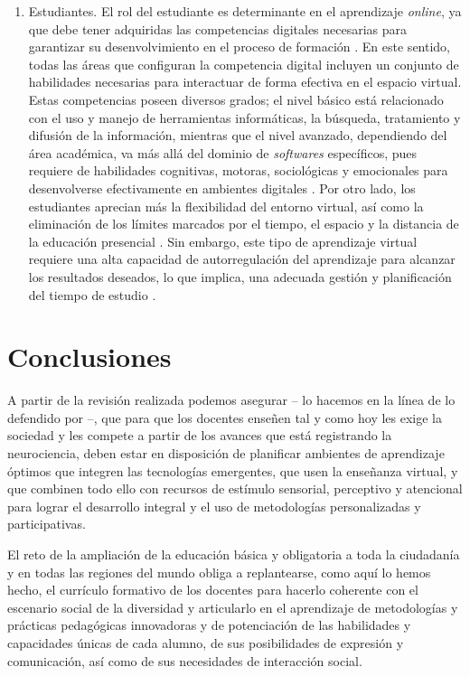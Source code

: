 \documentclass[spanish]{textolivre}
\begin{document}
\begin{enumerate}[label=\alph*.]
    \item Estudiantes. El rol del estudiante es determinante en el aprendizaje \textit{online}, ya que debe tener adquiridas las competencias digitales necesarias para garantizar su desenvolvimiento en el proceso de formación \cite{esteve_mon_nuevo_2011}. En este sentido, todas las áreas que configuran la competencia digital incluyen un conjunto de habilidades necesarias para interactuar de forma efectiva en el espacio virtual. Estas competencias poseen diversos grados; el nivel básico está relacionado con el uso y manejo de herramientas informáticas, la búsqueda, tratamiento y difusión de la información, mientras que el nivel avanzado, dependiendo del área académica, va más allá del dominio de \textit{softwares} específicos, pues requiere de habilidades cognitivas, motoras, sociológicas y emocionales para desenvolverse efectivamente en ambientes digitales \cite{valerio_urena_competencias_2012,fernandez_marquez_formacion_2017}. Por otro lado, los estudiantes aprecian más la flexibilidad del entorno virtual, así como la eliminación de los límites marcados por el tiempo, el espacio y la distancia de la educación presencial \cite{peterman_elements_2000}. Sin embargo, este tipo de aprendizaje virtual requiere una alta capacidad de autorregulación del aprendizaje para alcanzar los resultados deseados, lo que implica, una adecuada gestión y planificación del tiempo de estudio \cite{vohs_handbook_2016,van_laer_search_2017,garcia-marcos_autorregulacion_2020}.
\end{enumerate}

\section{Conclusiones}\label{sec-organizacao-latex}
A partir de la revisión realizada podemos asegurar -- lo hacemos en la línea de lo defendido por \textcite{fernandez_cruz_neuropedagogi_2022} --, que para que los docentes enseñen tal y como hoy les exige la sociedad y les compete a partir de los avances que está registrando la neurociencia,  deben estar en disposición de planificar  ambientes de aprendizaje óptimos que integren las tecnologías emergentes, que usen la enseñanza virtual, y que combinen todo ello con recursos de estímulo sensorial, perceptivo y atencional para lograr el desarrollo integral y el uso de metodologías personalizadas y participativas.

El reto de la ampliación de la educación básica y obligatoria a toda la ciudadanía y en todas las regiones del mundo obliga a replantearse, como aquí lo hemos hecho, el currículo formativo de los docentes para hacerlo coherente con el escenario social de la diversidad y articularlo en el aprendizaje de metodologías y prácticas pedagógicas innovadoras y de potenciación de las habilidades y capacidades únicas de cada alumno, de sus posibilidades de expresión y comunicación, así como de sus necesidades de interacción social. 
\end{document}
